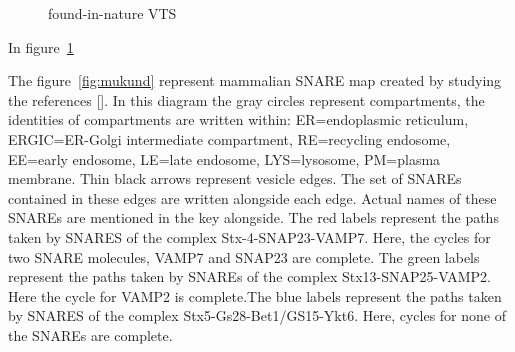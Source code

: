 \begin{figure}[t]
  \centering
  \caption{found-in-nature VTS}
  \label{fig:mukund-vts}
\end{figure}

In figure~\ref{fig:mukund-vts}


The figure~\ref{fig:mukund} represent mammalian SNARE map created by studying the references []. In this diagram the gray circles represent compartments, the identities of compartments are
written within: ER=endoplasmic reticulum, ERGIC=ER-Golgi intermediate compartment,
RE=recycling endosome, EE=early endosome, LE=late endosome, LYS=lysosome, PM=plasma
membrane. Thin black arrows represent vesicle edges.
The set of SNAREs contained in these edges are written alongside each edge. Actual names
of these SNAREs are mentioned in the key alongside. The red labels represent the paths taken by
SNARES of the complex Stx-4-SNAP23-VAMP7. Here, the cycles for two SNARE molecules,
VAMP7 and SNAP23 are complete. The green labels represent the paths taken by SNAREs of the
complex Stx13-SNAP25-VAMP2. Here the cycle for VAMP2 is complete.The blue labels represent
the paths taken by SNARES of the complex Stx5-Gs28-Bet1/GS15-Ykt6. Here, cycles for none of
the SNAREs are complete. 

